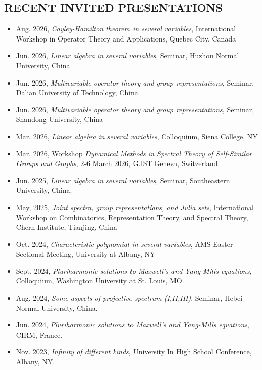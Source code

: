 \documentclass[12pt]{res} %
\begin{document}
\begin{resume}
\section{RECENT INVITED PRESENTATIONS}

\vspace{5mm}
\vspace{0.2in}
   \begin{itemize} \itemsep -2pt  %
   
 \item Aug. 2026, {\em Cayley-Hamilton theorem in several variables}, International Workshop in Operator Theory and Applications, Quebec City, Canada
 \item Jun. 2026, {\em Linear algebra in several variables}, Seminar, Huzhou Normal University, China
 \item Jun. 2026, {\em Multivariable operator theory and group representations}, Seminar, Dalian University of Technology, China 
 \item Jun. 2026, {\em Multivariable operator theory and group representations}, Seminar, Shandong University, China
 \item Mar. 2026, {\em Linear algebra in several variables}, Colloquium, Siena College, NY
 \item Mar. 2026, Workshop {\em Dynamical Methods in Spectral Theory of Self-Similar Groups and Graphs}, 2-6 March 2026, G.IST Geneva, Switzerland.
\item Jun. 2025, {\em Linear algebra in several variables}, Seminar, Southeastern University, China.   
\item May, 2025, {\em Joint spectra, group representations, and Julia sets}, International Workshop on Combinatorics, Representation Theory, and Spectral Theory, Chern Institute, Tianjing, China
\item Oct. 2024, {\em Characteristic polynomial in several variables}, AMS Easter Sectional Meeting, University at Albany, NY 
\item Sept. 2024, {\em Pluriharmonic solutions to Maxwell's and Yang-Mills equations}, Colloquium, Washington University at St. Louis, MO.
\item Aug. 2024, {\em Some aspects of projective spectrum (I,II,III)}, Seminar, Hebei Normal University, China.
\item Jun. 2024, {\em Pluriharmonic solutions to Maxwell's and Yang-Mills equations}, CIRM, France.
\item Nov. 2023, {\em Infinity of different kinds}, University In High School Conference, Albany, NY.

\end{itemize}
\end{resume}
\end{document}
